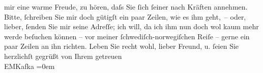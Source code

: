 \begin{ledgroupsized}[t]{13cm}
                    mir eine warme Freude, zu hören, daſs Sie ſich ſeiner nach Kräften annehmen.
                    Bitte, ſchreiben Sie mir doch gütigſt ein paar Zeilen, wie es ihm geht, – oder,
                    lieber, ſenden Sie mir seine Adreſſe; ich will, da ich ihm nun doch wol kaum
                    mehr werde beſuchen können – vor meiner ſchwediſch-norwegiſchen Reiſe –
                    gerne ein paar Zeilen an ihn richten.\pend
           \pstart
           Leben Sie recht wohl, lieber Freund, u. ſeien Sie herzlichſt gegrüßt\pend
           \pstart
           von Ihrem getreuen{\\[\baselineskip]}\spacefill\mbox{EMKafka}\pend
           \leftskip=0em{}\endnumbering{}\end{ledgroupsized}  \newcommand{\dateiname}{L00187}\newcommand{\titel}{Eduard Michael Kafka an Arthur Schnitzler, 7. 3. 1893}\newcommand{\editorInnen}{Martin Anton Müller und Gerd-Hermann Susen}
      